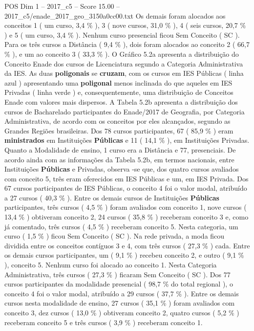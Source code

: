 \begin{textsample}{POS Dim 1 – 2017\_c5 – Score 15.00 – 2017\_c5/enade\_2017\_geo\_3150a0cc00.txt}
Os demais foram alocados aos conceitos 1 ( um curso, 3,4 \% ), 3 ( nove cursos, 31,0 \% ), 4 ( seis cursos, 20,7 \% ) e 5 ( um curso, 3,4 \% ).
Nenhum curso presencial ficou Sem Conceito ( SC ).
Para os três cursos a Distância ( 9,4 \% ), dois foram alocados ao conceito 2 ( 66,7 \% ), e um ao conceito 3 ( 33,3 \% ).
O Gráfico 5.2a apresenta a distribuição do Conceito Enade dos cursos de Licenciatura segundo a Categoria Administrativa da IES.
As duas \textbf{poligonais} se \textbf{cruzam}, com os cursos em IES Públicas ( linha azul ) apresentando uma \textbf{poligonal} menos inclinada do que aqueles em IES Privadas ( linha verde ) e, consequentemente, uma distribuição de Conceitos Enade com valores mais dispersos.
A Tabela 5.2b apresenta a distribuição dos cursos de Bacharelado participantes do Enade/2017 de Geografia, por Categoria Administrativa, de acordo com os conceitos por eles alcançados, segundo as Grandes Regiões brasileiras.
Dos 78 cursos participantes, 67 ( 85,9 \% ) eram \textbf{ministrados} em Instituições \textbf{Públicas} e 11 ( 14,1 \% ), em Instituições Privadas.
Quanto a Modalidade de ensino, 1 curso era a Distância e 77, presenciais.
De acordo ainda com as informações da Tabela 5.2b, em termos nacionais, entre Instituições \textbf{Públicas} e Privadas, observa -se que, dos quatro cursos avaliados com conceito 5, três eram oferecidos em IES Públicas e um, em IES Privada.
Dos 67 cursos participantes de IES Públicas, o conceito 4 foi o valor modal, atribuído a 27 cursos ( 40,3 \% ).
Entre os demais cursos de Instituições \textbf{Públicas} participantes, três cursos ( 4,5 \% ) foram avaliados com conceito 1, nove cursos ( 13,4 \% ) obtiveram conceito 2, 24 cursos ( 35,8 \% ) receberam conceito 3 e, como já comentado, três cursos ( 4,5 \% ) receberam conceito 5.
Nesta categoria, um curso ( 1,5 \% ) ficou Sem Conceito ( SC ).
Na rede privada, a moda ficou dividida entre os conceitos contíguos 3 e 4, com três cursos ( 27,3 \% ) cada.
Entre os demais cursos participantes, um ( 9,1 \% ) recebeu conceito 2, e outro ( 9,1 \% ), conceito 5.
Nenhum curso foi alocado ao conceito 1.
Nesta Categoria Administrativa, três cursos ( 27,3 \% ) ficaram Sem Conceito ( SC ).
Dos 77 cursos participantes da modalidade presencial ( 98,7 \% do total regional ), o conceito 4 foi o valor modal, atribuído a 29 cursos ( 37,7 \% ).
Entre os demais cursos nesta modalidade de ensino, 27 cursos ( 35,1 \% ) foram avaliados com conceito 3, dez cursos ( 13,0 \% ) obtiveram conceito 2, quatro cursos ( 5,2 \% ) receberam conceito 5 e três cursos ( 3,9 \% ) receberam conceito 1.

\end{textsample}
